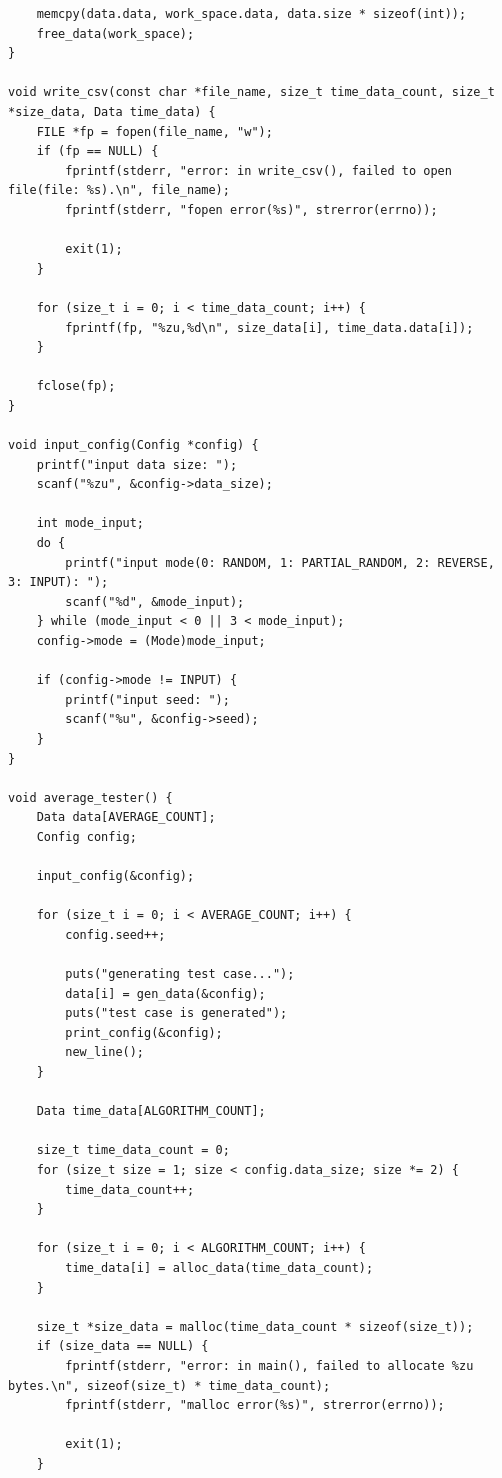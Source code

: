 \documentclass[dvipdfmx, a4paper, titlepage]{jsarticle}
\begin{document}
{\begin{verbatim}
    memcpy(data.data, work_space.data, data.size * sizeof(int));
    free_data(work_space);
}

void write_csv(const char *file_name, size_t time_data_count, size_t *size_data, Data time_data) {
    FILE *fp = fopen(file_name, "w");
    if (fp == NULL) {
        fprintf(stderr, "error: in write_csv(), failed to open file(file: %s).\n", file_name);
        fprintf(stderr, "fopen error(%s)", strerror(errno));

        exit(1);
    }

    for (size_t i = 0; i < time_data_count; i++) {
        fprintf(fp, "%zu,%d\n", size_data[i], time_data.data[i]);
    }

    fclose(fp);
}

void input_config(Config *config) {
    printf("input data size: ");
    scanf("%zu", &config->data_size);

    int mode_input;
    do {
        printf("input mode(0: RANDOM, 1: PARTIAL_RANDOM, 2: REVERSE, 3: INPUT): ");
        scanf("%d", &mode_input);
    } while (mode_input < 0 || 3 < mode_input);
    config->mode = (Mode)mode_input;

    if (config->mode != INPUT) {
        printf("input seed: ");
        scanf("%u", &config->seed);
    }
}

void average_tester() {
    Data data[AVERAGE_COUNT];
    Config config;

    input_config(&config);

    for (size_t i = 0; i < AVERAGE_COUNT; i++) {
        config.seed++;

        puts("generating test case...");
        data[i] = gen_data(&config);
        puts("test case is generated");
        print_config(&config);
        new_line();
    }

    Data time_data[ALGORITHM_COUNT];

    size_t time_data_count = 0;
    for (size_t size = 1; size < config.data_size; size *= 2) {
        time_data_count++;
    }

    for (size_t i = 0; i < ALGORITHM_COUNT; i++) {
        time_data[i] = alloc_data(time_data_count);
    }

    size_t *size_data = malloc(time_data_count * sizeof(size_t));
    if (size_data == NULL) {
        fprintf(stderr, "error: in main(), failed to allocate %zu bytes.\n", sizeof(size_t) * time_data_count);
        fprintf(stderr, "malloc error(%s)", strerror(errno));

        exit(1);
    }


\end{verbatim}}
\end{document}
